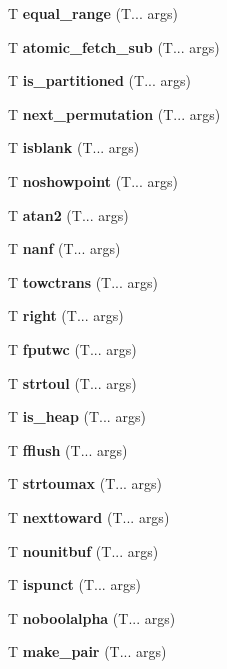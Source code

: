 \begin{DoxyCompactItemize}
T \textbf{ equal\+\_\+range} (T... args)
\item 
\mbox{\label{atomic_fetch_sub}} 
T \textbf{ atomic\+\_\+fetch\+\_\+sub} (T... args)
\item 
\mbox{\label{is_partitioned}} 
T \textbf{ is\+\_\+partitioned} (T... args)
\item 
\mbox{\label{next_permutation}} 
T \textbf{ next\+\_\+permutation} (T... args)
\item 
\mbox{\label{isblank}} 
T \textbf{ isblank} (T... args)
\item 
\mbox{\label{showpoint}} 
T \textbf{ noshowpoint} (T... args)
\item 
\mbox{\label{atan2}} 
T \textbf{ atan2} (T... args)
\item 
\mbox{\label{nan}} 
T \textbf{ nanf} (T... args)
\item 
\mbox{\label{towctrans}} 
T \textbf{ towctrans} (T... args)
\item 
\mbox{\label{left}} 
T \textbf{ right} (T... args)
\item 
\mbox{\label{fputwc}} 
T \textbf{ fputwc} (T... args)
\item 
\mbox{\label{strtoul}} 
T \textbf{ strtoul} (T... args)
\item 
\mbox{\label{is_heap}} 
T \textbf{ is\+\_\+heap} (T... args)
\item 
\mbox{\label{fflush}} 
T \textbf{ fflush} (T... args)
\item 
\mbox{\label{strtoimax}} 
T \textbf{ strtoumax} (T... args)
\item 
\mbox{\label{nextafter}} 
T \textbf{ nexttoward} (T... args)
\item 
\mbox{\label{unitbuf}} 
T \textbf{ nounitbuf} (T... args)
\item 
\mbox{\label{ispunct}} 
T \textbf{ ispunct} (T... args)
\item 
\mbox{\label{boolalpha}} 
T \textbf{ noboolalpha} (T... args)
\item 
\mbox{\label{make_pair}} 
T \textbf{ make\+\_\+pair} (T... args)
\item 
\mbox{\label{iswctype}} 

\end{DoxyCompactItemize}
